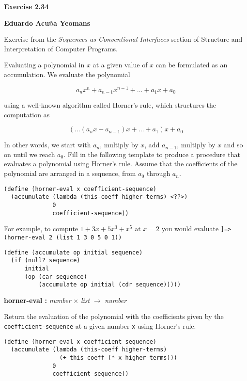 \documentclass[letterpaper, 12pt]{article}
\begin{document}
\hfill {\LARGE \textbf{Exercise 2.34} }

\bigskip


\hfill {\large \textbf{Eduardo Acuña Yeomans} }

\bigskip


\bigskip

Exercise from the \emph{Sequences as Conventional Interfaces}
section of Structure and Interpretation of Computer Programs.

\bigskip




Evaluating a polynomial in $x$ at a given value of $x$ can
be formulated as an accumulation. We evaluate the polynomial

$$a_{n}x^{n}+a_{n-1}x^{n-1}+ \dots +a_{1}x + a_{0}$$

using a well-known algorithm called Horner's rule, which structures the
computation as

$$( \dots (a_{n}x + a_{n-1})x + \dots + a_{1})x+a_{0}$$

In other words, we start with $a_{n}$, multiply by $x$, add $a_{n-1}$,
multiply by $x$ and so on until we reach $a_{0}$. Fill in the following
template to produce a procedure that evaluates a polynomial using
Horner's rule. Assume that the coefficients of the polynomial are
arranged in a sequence, from $a_{0}$ through $a_{n}$.

\begin{verbatim}
(define (horner-eval x coefficient-sequence)
  (accumulate (lambda (this-coeff higher-terms) <??>)
              0
              coefficient-sequence))
\end{verbatim}

For example, to compute $1+3x+5x^{3}+x^{5}$ at $x=2$ you would evaluate
\texttt{]=> (horner-eval 2 (list 1 3 0 5 0 1))}
\begin{verbatim}
(define (accumulate op initial sequence)
  (if (null? sequence)
      initial
      (op (car sequence)
          (accumulate op initial (cdr sequence)))))
\end{verbatim}


\bigskip

\bigskip

\textbf{horner-eval :} \emph{number} $\times$ \emph{list} $\boldsymbol{\rightarrow}$ \emph{number}


Return the evaluation of the polynomial with the coefficients
given by the \texttt{coefficient-sequence} at a given number \texttt{x}
using Horner's rule.
\begin{verbatim}
(define (horner-eval x coefficient-sequence)
  (accumulate (lambda (this-coeff higher-terms)
                (+ this-coeff (* x higher-terms)))
              0
              coefficient-sequence))
\end{verbatim}
\end{document}

